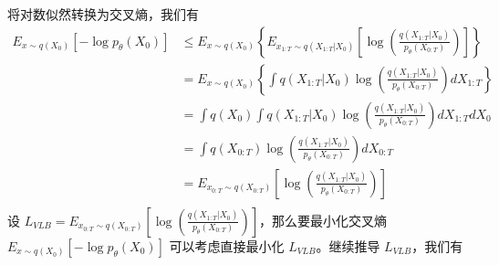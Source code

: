 \documentclass[12pt,a4paper,UTF8]{article}
\begin{document}
将对数似然转换为交叉熵，我们有
\[\begin{aligned}
E_{x\sim q\left(X_{0}\right)}\left[-\log p_{\theta}\left(X_0\right)\right]&\leq E_{x\sim q\left(X_{0}\right)}\left\{E_{x_{1:T}\sim q\left(X_{1:T}|X_{0}\right)}\left[\log\left(\frac{q\left(X_{1:T}|X_{0}\right)}{p_{\theta}\left(X_{0:T}\right)}\right)\right]\right\}\\
&=E_{x\sim q\left(X_{0}\right)}\left\{\int q\left(X_{1:T}|X_{0}\right)\log\left(\frac{q\left(X_{1:T}|X_{0}\right)}{p_{\theta}\left(X_{0:T}\right)}\right)dX_{1:T}\right\}\\
&=\int q\left(X_{0}\right)\int q\left(X_{1:T}|X_{0}\right)\log\left(\frac{q\left(X_{1:T}|X_{0}\right)}{p_{\theta}\left(X_{0:T}\right)}\right)dX_{1:T}dX_{0}\\
&=\int q\left(X_{0:T}\right)\log\left(\frac{q\left(X_{1:T}|X_{0}\right)}{p_{\theta}\left(X_{0:T}\right)}\right)dX_{0:T}\\
&=E_{x_{0:T}\sim q\left(X_{0:T}\right)}\left[\log\left(\frac{q\left(X_{1:T}|X_{0}\right)}{p_{\theta}\left(X_{0:T}\right)}\right)\right]\\
\end{aligned}\]
设 $L_{VLB}=E_{x_{0:T}\sim q\left(X_{0:T}\right)}\left[\log\left(\frac{q\left(X_{1:T}|X_{0}\right)}{p_{\theta}\left(X_{0:T}\right)}\right)\right]$，那么要最小化交叉熵 $E_{x\sim q\left(X_{0}\right)}\left[-\log p_{\theta}\left(X_0\right)\right]$ 可以考虑直接最小化 $L_{VLB}$。继续推导 $L_{VLB}$，我们有
\end{document}

